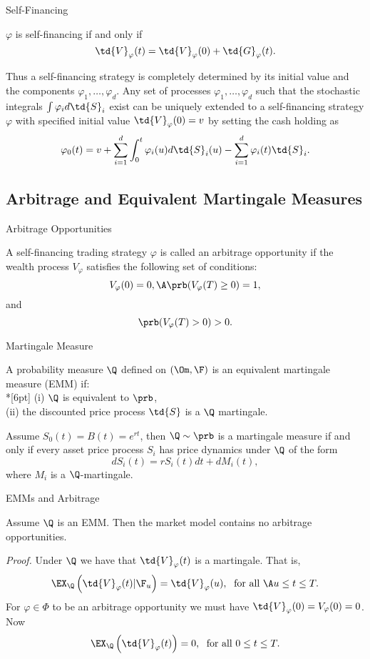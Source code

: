 { Self-Financing}

$\varphi$ is self-financing if and only if
$$
\td{V}_\varphi(t) = \td{V}_\varphi(0) + \td{G}_\varphi(t).
$$

Thus a self-financing strategy is completely determined by its
initial value and the components $\varphi_1, \ldots, \varphi_d$.
Any set of processes $\varphi_1, \ldots, \varphi_d$
such that the stochastic integrals $\int \varphi_i d\td{S}_i$
exist can be uniquely extended to a self-financing strategy
$\varphi$ with specified initial value $\td{V}_\varphi(0)= v$ by
setting the cash holding as
$$
\varphi_0(t) = v + \sum_{i=1}^d \int_0^t \varphi_i(u) d\td{S}_i(u)
- \sum_{i=1}^d \varphi_i(t) \td{S}_i.
$$

\subsection{Arbitrage and Equivalent Martingale Measures}

{ Arbitrage Opportunities}

A self-financing trading strategy $\varphi$ is called an arbitrage
opportunity if the wealth process $V_\varphi$ satisfies the
following set of conditions:
$$
V_\varphi(0)=0,\A \prb(V_\varphi(T) \geq 0) =1,
$$
and
$$
\prb(V_\varphi(T) > 0) >0.
$$


{ Martingale Measure}

A probability measure $\Q$ defined on $(\Om,\F)$ is an equivalent
martingale measure (EMM) if:\\*[6pt]
(i) $\Q$ is equivalent to $\prb$,\\
(ii) the discounted price process $\td{S}$ is a $\Q$ martingale.

Assume $S_0(t) = B(t) = e^{rt}$, then $\Q \sim \prb$ is a
martingale measure if and only if every asset price process $S_i$
has price dynamics under $\Q$ of the form
$$
dS_i(t) = r S_i(t) dt + dM_i(t),
$$
where $M_i$ is a $\Q$-martingale.

{ EMMs and Arbitrage}

Assume $\Q$ is an EMM. Then the market model contains no arbitrage
opportunities.

{\it Proof.} Under $\Q$ we have that $\td{V}_\varphi(t)$ is a
martingale. That is,
$$
\EX_{\Q}\left(\td{V}_\varphi(t)|\F_u\right) = \td{V}_\varphi(u),\;
\mbox{ for all }\A u \leq t \leq T.
$$
For $\varphi \in \Phi$ to be an arbitrage opportunity we must have
$\td{V}_\varphi(0) =V_\varphi(0)= 0$.  Now
$$
\EX_{\Q}\left(\td{V}_\varphi(t)\right) = 0,\; \mbox{ for all } 0
\leq t \leq T.
$$

